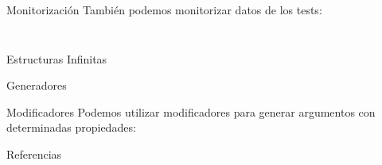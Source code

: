 \documentclass[10pt]{beamer}
\newcommand\Fontvi{\fontsize{10}{12}\selectfont}
\begin{document}
\begin{frame}[standout]
  \Fontvi
  \inputminted{text}{data/pruebas_max_prop.txt}
\end{frame}

\begin{frame}{Monitorización}
  También podemos monitorizar datos de los tests:
  \inputminted{haskell}{data/monitor_test.hs}
\end{frame}

\begin{frame}[standout]
  \Fontvi
  \inputminted{text}{data/monitor_test_pruebas.txt}
\end{frame}

\begin{frame}{Estructuras Infinitas}

\end{frame}

\begin{frame}{Generadores}

\end{frame}

\begin{frame}{Modificadores}
  Podemos utilizar modificadores para generar argumentos con
  determinadas propiedades:

\end{frame}

\appendix

\begin{frame}{Referencias}

  
  

\end{frame}
\end{document}

